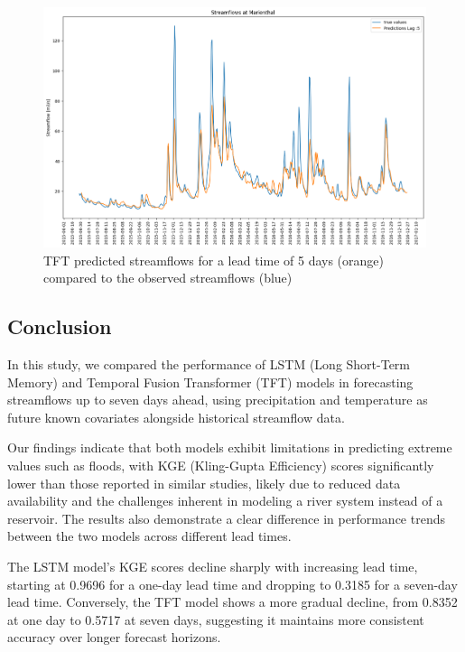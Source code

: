 \documentclass[
]{article}
\begin{document}
\begin{figure}

{\centering \includegraphics[width=500]{work/07-hydroLSTM/images/lag5_tft} 

}

\caption{TFT predicted streamflows for a lead time of 5 days (orange) compared to the observed streamflows (blue)}\label{fig:8}
\end{figure}

\hypertarget{conclusion}{%
\subsection{Conclusion}\label{conclusion}}

In this study, we compared the performance of LSTM (Long Short-Term
Memory) and Temporal Fusion Transformer (TFT) models in forecasting
streamflows up to seven days ahead, using precipitation and temperature
as future known covariates alongside historical streamflow data.

Our findings indicate that both models exhibit limitations in predicting
extreme values such as floods, with KGE (Kling-Gupta Efficiency) scores
significantly lower than those reported in similar studies, likely due
to reduced data availability and the challenges inherent in modeling a
river system instead of a reservoir. The results also demonstrate a
clear difference in performance trends between the two models across
different lead times.

The LSTM model's KGE scores decline sharply with increasing lead time,
starting at 0.9696 for a one-day lead time and dropping to 0.3185 for a
seven-day lead time. Conversely, the TFT model shows a more gradual
decline, from 0.8352 at one day to 0.5717 at seven days, suggesting it
maintains more consistent accuracy over longer forecast horizons.
\end{document}
